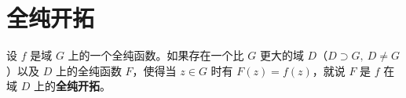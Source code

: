 \documentclass[../main.tex]{subfiles} %
\begin{document}
\chapter{全纯开拓}

\begin{definition}
设 \(f\) 是域 \(G\) 上的一个全纯函数。如果存在一个比 \(G\) 更大的域 \(D\)（\(D \supset G,\ D \neq G\)）以及 \(D\) 上的全纯函数 \(F\)，使得当 \(z \in G\) 时有 \(F(z) = f(z)\)，就说 \(F\) 是 \(f\) 在域 \(D\) 上的\textbf{全纯开拓}。
\end{definition}




















\end{document}
